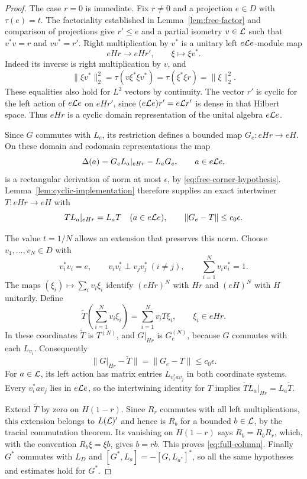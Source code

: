 \begin{proof}
The case $r=0$ is immediate. Fix $r\ne0$ and a projection $e\in D$ with
$\tau(e)=t$. The factoriality established in Lemma~\ref{lem:free-factor}
and comparison of projections give $r'\le e$ and a partial isometry
$v\in\mathcal L$ such that $v^*v=r$ and $vv^*=r'$. Right multiplication by $v^*$
is a unitary left $e\mathcal L e$-module map
\[
  eHr\longrightarrow eHr',\qquad \xi\longmapsto\xi v^*.
\]
Indeed its inverse is right multiplication by $v$, and
\[
  \|\xi v^*\|_2^2
    =\tau(v\xi^*\xi v^*)
    =\tau(\xi^*\xi r)=\|\xi\|_2^2.
\]
These equalities also hold for $L^2$ vectors by continuity. The vector $r'$
is cyclic for the left action of $e\mathcal L e$ on $eHr'$, since
$(e\mathcal L e)r'=e\mathcal L r'$ is dense in that Hilbert space. Thus $eHr$ is a
cyclic domain representation of the unital algebra $e\mathcal L e$.

Since $G$ commutes with $L_e$, its restriction defines a bounded map
$G_e:eHr\to eH$. On these domain and codomain representations the map
\[
  \Delta(a)=G_eL_a|_{eHr}-L_aG_e,\qquad a\in e\mathcal L e,
\]
is a rectangular derivation of norm at most $\epsilon$, by
\eqref{eq:free-corner-hypothesis}. Lemma~\ref{lem:cyclic-implementation}
therefore supplies an exact intertwiner $T:eHr\to eH$ with
\[
  TL_a|_{eHr}=L_aT\quad(a\in e\mathcal L e),\qquad
  \|G_e-T\|\le c_0\epsilon.
\]

The value $t=1/N$ allows an extension that preserves this norm. Choose
$v_1,\ldots,v_N\in D$ with
\[
  v_i^*v_i=e,\qquad v_iv_i^*\perp v_jv_j^*\ (i\ne j),\qquad
  \sum_{i=1}^N v_iv_i^*=1.
\]
The maps $(\xi_i)\mapsto\sum_i v_i\xi_i$ identify $(eHr)^N$ with $Hr$
and $(eH)^N$ with $H$ unitarily. Define
\[
  \widetilde T\left(\sum_{i=1}^N v_i\xi_i\right)
      =\sum_{i=1}^N v_iT\xi_i,\qquad \xi_i\in eHr.
\]
In these coordinates $\widetilde T$ is $T^{(N)}$, and $G|_{Hr}$ is
$G_e^{(N)}$, because $G$ commutes with each $L_{v_i}$. Consequently
\[
  \|G|_{Hr}-\widetilde T\|=\|G_e-T\|\le c_0\epsilon.
\]
For $a\in\mathcal L$, its left action has matrix entries $L_{v_i^*av_j}$ in
both coordinate systems. Every $v_i^*av_j$ lies in $e\mathcal L e$, so the
intertwining identity for $T$ implies
$\widetilde T L_a|_{Hr}=L_a\widetilde T$.

Extend $\widetilde T$ by zero on $H(1-r)$. Since $R_r$ commutes with all
left multiplications, this extension belongs to $L(\mathcal L)'$ and hence is
$R_b$ for a bounded $b\in\mathcal L$, by the tracial commutation theorem. Its
vanishing on $H(1-r)$ says $R_b=R_bR_r$, which, with the convention
$R_b\xi=\xi b$, gives $b=rb$. This proves \eqref{eq:full-column}.
Finally $G^*$ commutes with $L_D$ and
$[G^*,L_a]=-[G,L_{a^*}]^*$, so all the same hypotheses and estimates
hold for $G^*$.
\end{proof}

